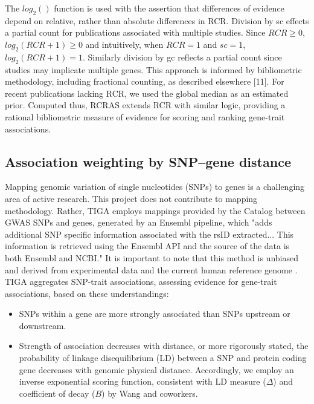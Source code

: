 The $log_2()$ function is used with the assertion that differences of evidence depend on relative, rather than absolute differences in RCR. Division by sc effects a partial count for publications associated with multiple studies.  Since $RCR \geq 0$, $log_2(RCR + 1) \geq 0$ and intuitively, when $RCR = 1$ and $sc = 1$, $log_2(RCR + 1) = 1$. Similarly division by gc reflects a partial count since studies may implicate multiple genes. This approach is informed by bibliometric methodology, including fractional counting, as described elsewhere [11]. For recent publications lacking RCR, we used the global median as an estimated prior. Computed thus, RCRAS extends RCR with similar logic, providing a rational bibliometric measure of evidence for scoring and ranking gene-trait associations. 

\subsection{Association weighting by SNP–gene distance}

Mapping  genomic  variation  of  single  nucleotides  (SNPs)  to  genes  is  a  challenging  area  of active  research\cite{Liu2010-fe,Mishra2015-rm,Lamparter2016-zb}.  This project  does not contribute to mapping methodology.  Rather, TIGA employs mappings provided by the Catalog between GWAS SNPs and genes,  generated by an Ensembl pipeline, which "adds additional SNP specific information associated with the rsID extracted... This information is retrieved using the Ensembl API and the source of the data is both Ensembl and NCBI."\cite{The_NHGRI-EBI_GWAS_Catalog_undated-kl} It is important to note that this method is unbiased and derived from experimental data and the current human reference genome . TIGA aggregates SNP-trait associations, assessing evidence for gene-trait associations, based on these understandings:

\begin{itemize}
\item SNPs within a gene are more strongly associated than SNPs upstream or downstream.
\item Strength of association decreases with distance, or more rigorously stated, the probability of linkage disequilibrium (LD) between a SNP and protein coding gene decreases with genomic physical distance. Accordingly, we employ an inverse exponential scoring function, consistent with LD measure ($\Delta$) and coefficient of decay ($B$) by Wang and coworkers\cite{Wang2006-ja}. 
\end{itemize}


